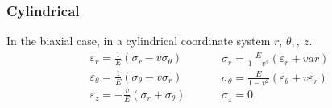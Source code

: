 \documentclass[class=report, crop=false, 12pt,a4paper]{standalone}
\begin{document}
\subsubsection{Cylindrical}
In the biaxial case, in a cylindrical coordinate system $r, \, \theta, ,\ z$.
\begin{equation}
    \begin{array}{l}
        \varepsilon_r = \frac{1}{E} \left(\sigma_r - v\sigma_{\theta}\right)\\
        \varepsilon_{\theta} = \frac{1}{E} \left(\sigma_{\theta} - v\sigma_r\right)\\
        \varepsilon_z = -\frac{v}{E} \left(\sigma_r + \sigma_{\theta}\right)
    \end{array} \hspace{1cm} 
    \begin{array}{l}
        \sigma_r = \frac{E}{1-v^2}\left(\varepsilon_r + var\right)\\
        \sigma_{\theta} = \frac{E}{1-v^2} \left(\varepsilon_{\theta} + v \varepsilon_r\right)\\
        \sigma_z = 0
    \end{array}
\end{equation}
\end{document}
